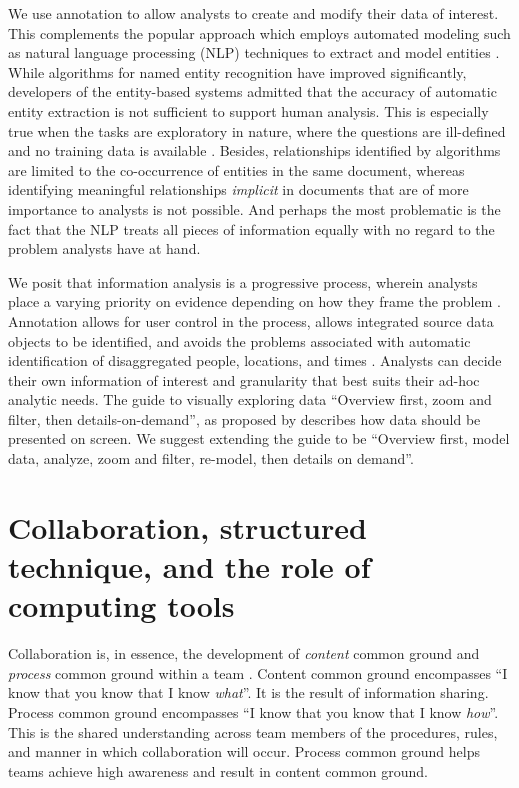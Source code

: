 We use annotation to allow analysts to create and modify their data of interest. This complements the popular approach which employs 
automated modeling such as natural language processing (NLP) techniques to extract and
model entities \citep{Bier2010, Stasko2008}. While algorithms for named
entity recognition have improved significantly, developers of the
entity-based systems \citep{Gorg2014} admitted that the
accuracy of automatic entity extraction is not sufficient to support
human analysis. This is especially true when the tasks are exploratory in nature, where the questions are ill-defined and no training data is available \citep{thomas2005illuminating}. Besides, relationships identified by algorithms are
limited to the co-occurrence of entities in the same document, whereas
identifying meaningful relationships \emph{implicit} in documents that
are of more importance to analysts is not possible. And perhaps the most
problematic is the fact that the NLP treats all pieces of information
equally with no regard to the problem analysts have at hand. 

We posit
that information analysis is a progressive process, wherein analysts
place a varying priority on evidence depending on how they frame the
problem \citep{Heuer1999}. Annotation allows for user
control in the process, allows integrated source data objects to be identified,
and avoids the problems associated with automatic identification of
disaggregated people, locations, and times \citep{Bier2008}. Analysts can
decide their own information of interest and granularity that best suits
their ad-hoc analytic needs. The guide to visually exploring data ``Overview first, zoom and filter, then details-on-demand'', as proposed by \cite{shneiderman2003eyes} describes how data should be presented on screen. We suggest extending the guide to be ``Overview first, model data, analyze, zoom and filter, re-model, then details on demand''.

\section{Collaboration, structured technique, and the role of computing tools}

Collaboration is, in essence, the development of \textit{content} common ground and \textit{process} common ground within a team \citep{Convertino2009}. Content common ground encompasses ``I know that you know that I know \textit{what}''. It is the result of information sharing. Process common ground encompasses ``I know that you know that I know \textit{how}''. This is the shared understanding across team members of the procedures, rules, and manner in which collaboration will occur. Process common ground helps teams achieve high awareness and result in content common ground.

